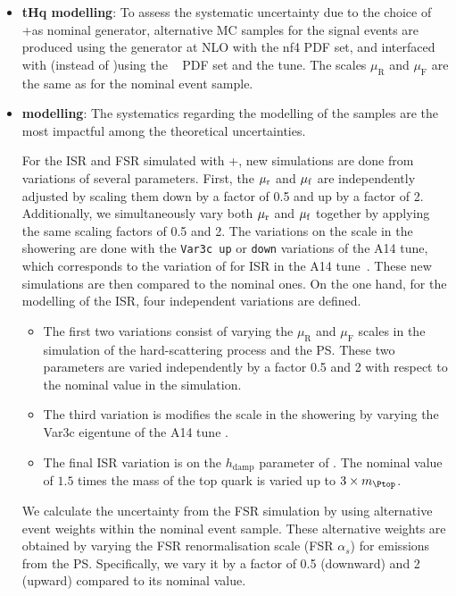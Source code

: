 \begin{itemize}

	\item \textbf{tHq modelling}: To assess the systematic uncertainty due to the choice
	of \MGNLO[2.6.2.]+\PYTHIA as nominal generator, alternative MC samples for the \tHq 
	signal events are produced using the \MGNLO[2.8.1] generator at NLO with 
	the \NNPDF[3.0nlo] nf4 PDF set, and interfaced with \HERWIG[7.1.6] (instead 
	of \PYTHIA)using the \MMHT[nnlo]~\cite{Harland-Lang:2014zoa} PDF set and the 
	\HERWIG[7.1]\cite{Bahr:2008pv, Bellm:2015jjp} tune. 
	The scales $\mu_{\text{R}}$ and $\mu_{\text{F}}$ are the same as for the nominal 
	\tHq event sample.

	\item \textbf{\ttbar modelling}: The systematics regarding the modelling of the \ttbar samples 
		are the most impactful among the theoretical uncertainties.  
		
		For the ISR and FSR simulated with \POWHEG+\PYTHIA, new simulations are done from 
		variations of several parameters. First, the $\mu_\mathrm{r}$ and $\mu_\mathrm{f}$ are independently adjusted
		by scaling them down by a factor of 0.5 and up by a factor of 2. 
		Additionally, we simultaneously vary both $\mu_\mathrm{r}$ and $\mu_\mathrm{f}$ together by applying the same scaling factors of 0.5 and 2.
		The variations on the scale in the showering are done with the \texttt{Var3c up} or 
		\texttt{down} variations of the A14 tune, which corresponds to the variation of \alphas 
		for ISR in the A14 tune~\cite{ATL-PHYS-PUB-2014-021}. 
		These new simulations are then compared to the nominal ones.
		On the one hand, for the modelling of the ISR, four independent variations are defined.
		\begin{itemize}
			\item The first two variations consist of varying the $\mu_{\text{R}}$ 
			and $\mu_{\text{F}}$ scales in the simulation of the hard-scattering process and the PS.
			These two parameters are varied independently by a factor 0.5 and 2 with 
		 	respect to the nominal value in the simulation.
			\item The third variation is modifies the scale in the showering by varying the Var3c 
			eigentune of the A14 tune \cite{ATL-PHYS-PUB-2017-007}.
			\item The final ISR variation is on the $h_{\text{damp}}$ parameter of \HERWIG.
			The nominal value of $1.5$ times the mass of the top quark is varied up to
			$3\times\mtop$.			
		\end{itemize}
		We calculate the uncertainty from the FSR simulation by using alternative event 
		weights within the nominal \ttbar event sample. These alternative weights are 
		obtained by varying the FSR renormalisation scale (FSR $\alpha_s$) for emissions from the PS. 
		Specifically, we vary it by a factor of 0.5 (downward) and 2 (upward) compared to its nominal value.
		

\end{itemize}
